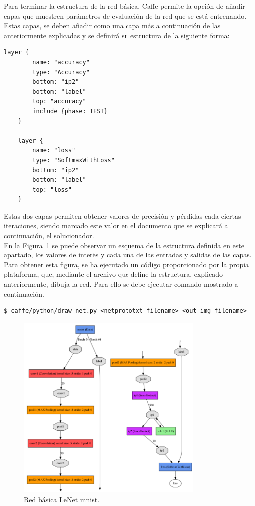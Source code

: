 	Para terminar la estructura de la red básica, Caffe permite la opción de añadir capas que muestren parámetros de evaluación de la red que se está entrenando. Estas capas, se deben añadir como una capa más a continuación de las anteriormente explicadas y se definirá su estructura de la siguiente forma:
	\vspace{10pt}
	\begin{lstlisting}[frame=single]
	layer {
		name: "accuracy"
		type: "Accuracy"
		bottom: "ip2"
		bottom: "label"
		top: "accuracy"
		include {phase: TEST}
	}
	
	layer {
		name: "loss"
		type: "SoftmaxWithLoss"
		bottom: "ip2"
		bottom: "label"
		top: "loss"
	}	
	\end{lstlisting}
	
	Estas dos capas permiten obtener valores de precisión y pérdidas cada ciertas iteraciones, siendo marcado este valor en el documento que se explicará a continuación, el solucionador.\\

	En la Figura~\ref{fig.redBasica} se puede observar un esquema de la estructura definida en este apartado, los valores de interés y cada una de las entradas y salidas de las capas. Para obtener esta figura, se ha ejecutado un código proporcionado por la propia plataforma, que, mediante el archivo que define la estructura, explicado anteriormente, dibuja la red. Para ello se debe ejecutar comando mostrado a continuación.
	\vspace{20pt}
	\begin{lstlisting}[frame=single]
	$ caffe/python/draw_net.py <netprototxt_filename> <out_img_filename>
	\end{lstlisting}
	
	\begin{figure}[H]
		\begin{center}
			\includegraphics[width=0.8\textwidth]{figures/Original_net}
			\caption{Red básica LeNet \acrshort{mnist}.}
			\label{fig.redBasica}
		\end{center}
	\end{figure}
	
